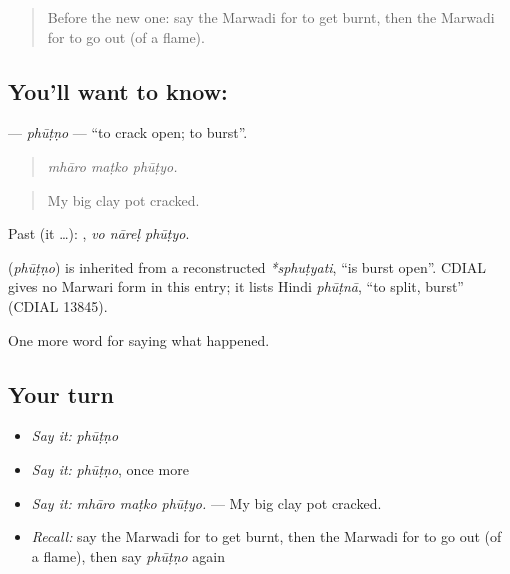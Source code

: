 \label{lesson:MW-C242-phutno}



\begin{quote}
Before the new one: say the Marwadi for to get burnt, then the Marwadi for to go out (of a flame).
\end{quote}

\subsection*{You'll want to know: }
\textbf{} — \emph{phūṭṇo} — \textquotedblleft{}to crack open; to burst\textquotedblright{}.

\begin{quote}
  
\end{quote}

\begin{quote}
\emph{mhāro maṭko phūṭyo.}
\end{quote}

\begin{quote}
My big clay pot cracked.
\end{quote}

Past (it …):   , \emph{vo nāreḷ phūṭyo}.

\begin{cousinweb}
\textbf{} (\emph{phūṭṇo}) is inherited from a reconstructed \emph{*sphuṭyati}, \textquotedblleft{}is burst open\textquotedblright{}. CDIAL gives no Marwari form in this entry; it lists Hindi \emph{phūṭnā}, \textquotedblleft{}to split, burst\textquotedblright{} (CDIAL 13845).
\end{cousinweb}

\begin{grammarlens}[title={What you've built}]
One more word for saying what happened.
\end{grammarlens}

\subsection*{Your turn}
\begin{itemize}
\raggedright
  \item \emph{Say it:} \emph{phūṭṇo}
  \item \emph{Say it:} \emph{phūṭṇo}, once more
  \item \emph{Say it:} \emph{mhāro maṭko phūṭyo.} — My big clay pot cracked.
  \item \emph{Recall:} say the Marwadi for to get burnt, then the Marwadi for to go out (of a flame), then say \emph{phūṭṇo} again
\end{itemize}

